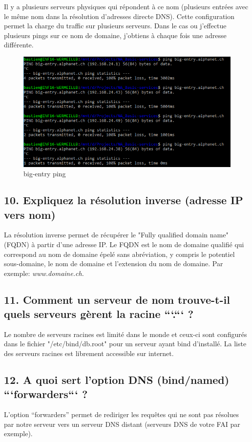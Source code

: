\documentclass{article}
\begin{document}
Il y a plusieurs serveurs physiques qui répondent à ce nom (plusieurs entrées avec le même nom dans la résolution d'adresses directe DNS). Cette configuration permet la charge du traffic sur plusieurs serveurs. Dans le cas ou j'effectue plusieurs pings sur ce nom de domaine, j'obtiens à chaque fois une adresse différente.

\begin{figure}[h]
	\centering
	\includegraphics{./captures/ping-bigentry.png}
	\caption{big-entry ping}
	\label{fig:Strates}
\end{figure}
\clearpage

\subsection*{10. Expliquez la résolution inverse (adresse IP vers nom)}
La résolution inverse permet de récupérer le "Fully qualified domain name" (FQDN) à partir d'une adresse IP. Le FQDN est le nom de domaine qualifié qui correspond au nom de domaine épelé sans abréviation, y compris le potentiel sous-domaine, le nom de domaine et l'extension du nom de domaine. Par exemple:
\textit{www.domaine.ch.}

\subsection*{11. Comment un serveur de nom trouve-t-il quels serveurs gèrent la racine ```.``` ?}
Le nombre de serveurs racines est limité dans le monde et ceux-ci sont configurés dans le fichier "/etc/bind/db.root" pour un serveur ayant bind d'installé. La liste des serveurs racines est librement accessible sur internet.

\subsection*{12. A quoi sert l’option DNS (bind/named) ```forwarders``` ?}
L'option “forwarders” permet de rediriger les requêtes qui ne sont pas résolues par notre serveur vers un serveur DNS distant (serveurs DNS de votre FAI par exemple)\cite{dns-forwarding}.
\end{document}
